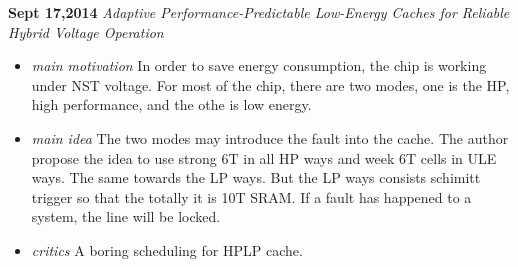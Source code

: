 \documentclass[]{article}
\begin{document}
\noindent \textbf{Sept 17,2014}
\textit{Adaptive Performance-Predictable Low-Energy Caches for Reliable Hybrid Voltage Operation}
\indent     \begin{itemize}
            \item \textit{main motivation} In order to save energy consumption, the chip is working under NST voltage.
            For most of the chip, there are two modes, one is the HP, high performance, and the othe is low energy.

            \item \textit{main idea} The two modes may introduce the fault into the cache. The author propose the idea to
            use strong 6T in all HP ways and week 6T cells in ULE ways. The same towards the LP ways. But the LP ways 
            consists schimitt trigger so that the totally it is 10T SRAM. If a fault has happened to a system, the line 
            will be locked. 

            \item \textit{critics} A boring scheduling for HPLP cache.
        \end{itemize}
\end{document}
